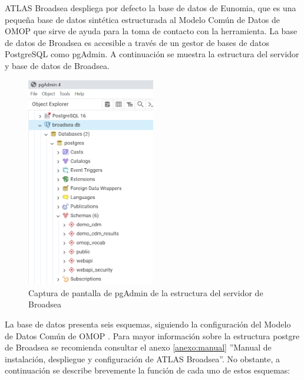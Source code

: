 ATLAS Broadsea despliega por defecto la base de datos de Eunomia, que es una pequeña base de datos sintética estructurada al Modelo Común de Datos de OMOP que sirve de ayuda para la toma de contacto con la herramienta. La base de datos de Broadsea es accesible a través de un gestor de bases de datos PostgreSQL como pgAdmin. A continuación se muestra la estructura del servidor y base de datos de Broadsea.

\begin{figure}[H]
\centering
\includegraphics[width=0.50\textwidth]{figures/serverBroadsea.png}
     \caption{Captura de pantalla de pgAdmin de la estructura del servidor de Broadsea}
    \label{fig:serverBroadsea}
\end{figure}

La base de datos presenta seis esquemas, siguiendo la configuración del Modelo de Datos Común de OMOP \parencite{githubCDMConfig}. Para mayor información sobre la estructura postgre de Broadsea se recomienda consultar el anexo \ref{anexo:manual} ''Manual de instalación, despliegue y configuración de ATLAS Broadsea''. No obstante, a continuación se describe brevemente la función de cada uno de estos esquemas:

